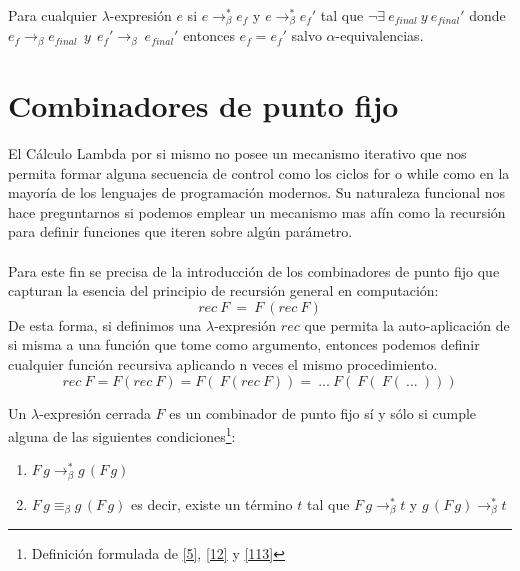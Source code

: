                     \begin{corollary}
Para cualquier $\lambda$-expresión $e$ si $e\to_\beta^*e_f$ y $e\to_\beta^*e_f'$ tal que  $\neg \exists\ e_{final}\ y\ e_{final}'$ donde $e_f \rightarrow_{\beta} e_{final}\ \ y\ \ e_f' \rightarrow_{\beta}\ e_{final}'$
entonces $e_f = e_f'$ salvo $\alpha$-equivalencias. 
                    \end{corollary}

        \section{Combinadores de punto fijo}
                    El Cálculo Lambda por si mismo no posee un mecanismo iterativo que nos permita formar alguna secuencia de control como los ciclos \textsf{for} o \textsf{while} como en la mayoría de los lenguajes de programación modernos. Su naturaleza funcional nos hace preguntarnos si podemos emplear un mecanismo mas afín como la recursión para definir funciones que iteren sobre algún parámetro.\\\\
                   Para este fin se precisa de la introducción de los combinadores de punto fijo que capturan la esencia del principio de recursión general en computación:
                    $$ rec\ F\ =\ F\ (rec\ F) $$
                    De esta forma, si definimos una $\lambda$-expresión $rec$ que permita la auto-aplicación de si misma a una función que tome como argumento, entonces podemos definir cualquier función recursiva aplicando n veces el mismo procedimiento.
                    $$rec\ F = F(rec\ F) = F(\ F(rec\ F)) =\ ...\ F(\ F(\ F(\ ...\ )))$$
                    
                    \begin{definition} Un $\lambda$-expresión cerrada $F$ es un combinador de punto fijo sí y sólo si cumple alguna de las siguientes condiciones\footnote{Definición formulada de \hyperlink{5}{[5]}, \hyperlink{12}{[12]} y \hyperlink{113}{[113]}}:
                        \begin{enumerate}
                            \item $F\,g\to_\beta^*g\,(F\,g)$
                            \item $F\,g\equiv_\beta g\,(F\,g)$ es decir, existe un término $t$ tal que $F\,g\to_\beta^*t$ y $g\,(F\,g)\to_\beta^*t$
                        \end{enumerate}
                    \end{definition}

